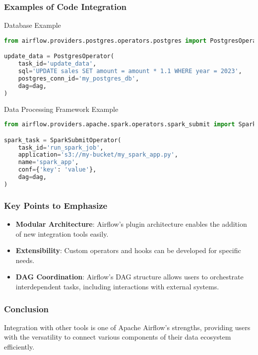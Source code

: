 \documentclass[aspectratio=169]{beamer}
\begin{document}
\begin{frame}[fragile]
    \frametitle{Examples of Code Integration}
    \begin{block}{Database Example}
        \begin{lstlisting}[language=Python]
from airflow.providers.postgres.operators.postgres import PostgresOperator

update_data = PostgresOperator(
    task_id='update_data',
    sql='UPDATE sales SET amount = amount * 1.1 WHERE year = 2023',
    postgres_conn_id='my_postgres_db',
    dag=dag,
)
        \end{lstlisting}
    \end{block}

    \begin{block}{Data Processing Framework Example}
        \begin{lstlisting}[language=Python]
from airflow.providers.apache.spark.operators.spark_submit import SparkSubmitOperator

spark_task = SparkSubmitOperator(
    task_id='run_spark_job',
    application='s3://my-bucket/my_spark_app.py',
    name='spark_app',
    conf={'key': 'value'},
    dag=dag,
)
        \end{lstlisting}
    \end{block}
\end{frame}

\begin{frame}[fragile]
    \frametitle{Key Points to Emphasize}
    \begin{itemize}
        \item \textbf{Modular Architecture}:
            Airflow’s plugin architecture enables the addition of new integration tools easily.
        
        \item \textbf{Extensibility}:
            Custom operators and hooks can be developed for specific needs.
        
        \item \textbf{DAG Coordination}:
            Airflow's DAG structure allows users to orchestrate interdependent tasks, including interactions with external systems.
    \end{itemize}
\end{frame}

\begin{frame}
    \frametitle{Conclusion}
    Integration with other tools is one of Apache Airflow's strengths, providing users with the versatility to connect various components of their data ecosystem efficiently.
\end{frame}
\end{document}
